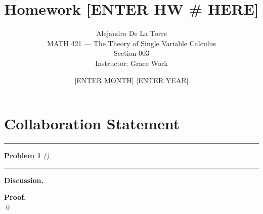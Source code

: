 \documentclass[12pt]{article}
\title{Homework [ENTER HW # HERE]}
\author{Alejandro De La Torre \\ MATH 421 — The Theory of Single Variable Calculus \\ Section 003 \\ Instructor: Grace Work}
\date{[ENTER MONTH] [ENTER YEAR]}
\newcommand{\problem}[2][]{%
  \vspace{0.5em}
  \hrule\vspace{0.4em}
  \textbf{Problem #2}\if\relax\detokenize{#1}\relax\else\; \textit{(#1)}\fi
  \vspace{0.25em}\hrule\vspace{0.8em}
}
\newcommand{\ignore}[1]{}
\begin{document}
\maketitle

\section*{Collaboration Statement}

\bigskip


\problem[\ignore{Enter Question here}]{1}
\vspace{0.75em}

\textbf{Discussion.} \\
\vspace{0.25em}

\textbf{Proof.}\\
\qed
\end{document}
